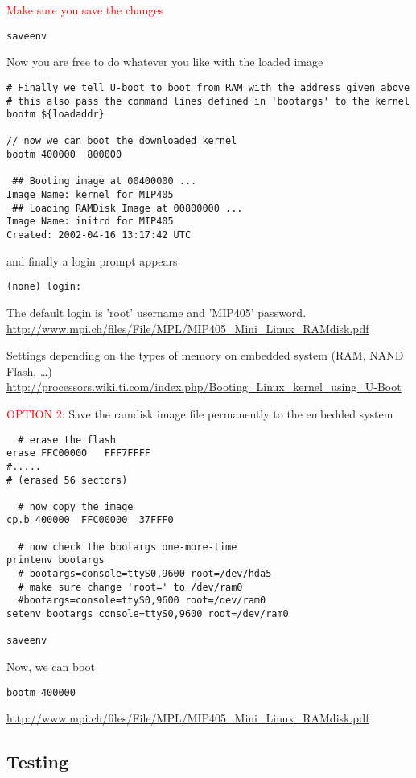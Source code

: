 \textcolor{red}{Make sure you save the changes}
\begin{verbatim}
saveenv
\end{verbatim}

Now you are free to do whatever you like with the loaded image
\begin{verbatim}
# Finally we tell U-boot to boot from RAM with the address given above
# this also pass the command lines defined in 'bootargs' to the kernel
bootm ${loadaddr}
 
// now we can boot the downloaded kernel
bootm 400000  800000

 ## Booting image at 00400000 ...
Image Name: kernel for MIP405
 ## Loading RAMDisk Image at 00800000 ...
Image Name: initrd for MIP405
Created: 2002-04-16 13:17:42 UTC
\end{verbatim}
and finally a login prompt appears
\begin{verbatim}
(none) login:
\end{verbatim}
The default login is 'root' username and 'MIP405' password.
\url{http://www.mpi.ch/files/File/MPL/MIP405_Mini_Linux_RAMdisk.pdf}

Settings depending on the types of memory on embedded system (RAM, NAND Flash,
\ldots)
\url{http://processors.wiki.ti.com/index.php/Booting_Linux_kernel_using_U-Boot}

\textcolor{red}{OPTION 2:} Save the ramdisk image file permanently to the
embedded system
\begin{verbatim}
  # erase the flash
erase FFC00000   FFF7FFFF
#.....
# (erased 56 sectors)

  # now copy the image
cp.b 400000  FFC00000  37FFF0

  # now check the bootargs one-more-time
printenv bootargs
  # bootargs=console=ttyS0,9600 root=/dev/hda5
  # make sure change 'root=' to /dev/ram0
  #bootargs=console=ttyS0,9600 root=/dev/ram0
setenv bootargs console=ttyS0,9600 root=/dev/ram0

saveenv  
\end{verbatim}

Now, we can boot
\begin{verbatim}
bootm 400000
\end{verbatim}
\url{http://www.mpi.ch/files/File/MPL/MIP405_Mini_Linux_RAMdisk.pdf}

\subsection{Testing}


